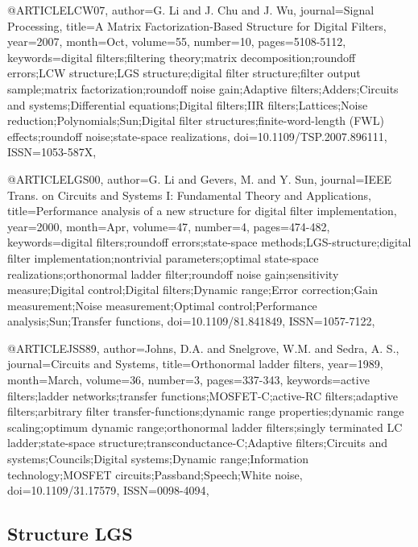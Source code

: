  

@ARTICLE{LCW07, 
author={G. Li and J. Chu and J. Wu}, 
journal={Signal Processing}, 
title={A Matrix Factorization-Based Structure for Digital Filters}, 
year={2007}, 
month={Oct}, 
volume={55}, 
number={10}, 
pages={5108-5112}, 
keywords={digital filters;filtering theory;matrix decomposition;roundoff errors;LCW structure;LGS structure;digital filter structure;filter output sample;matrix factorization;roundoff noise gain;Adaptive filters;Adders;Circuits and systems;Differential equations;Digital filters;IIR filters;Lattices;Noise reduction;Polynomials;Sun;Digital filter structures;finite-word-length (FWL) effects;roundoff noise;state-space realizations}, 
doi={10.1109/TSP.2007.896111}, 
ISSN={1053-587X},}

@ARTICLE{LGS00, 
author={G. Li and Gevers, M. and Y. Sun}, 
journal={{IEEE} Trans. on  Circuits and Systems I: Fundamental Theory and Applications}, 
title={Performance analysis of a new structure for digital filter implementation}, 
year={2000}, 
month={Apr}, 
volume={47}, 
number={4}, 
pages={474-482}, 
keywords={digital filters;roundoff errors;state-space methods;LGS-structure;digital filter implementation;nontrivial parameters;optimal state-space realizations;orthonormal ladder filter;roundoff noise gain;sensitivity measure;Digital control;Digital filters;Dynamic range;Error correction;Gain measurement;Noise measurement;Optimal control;Performance analysis;Sun;Transfer functions}, 
doi={10.1109/81.841849}, 
ISSN={1057-7122},}

@ARTICLE{JSS89, 
author={Johns, D.A. and Snelgrove, W.M. and Sedra, A. S.}, 
journal={Circuits and Systems}, 
title={Orthonormal ladder filters}, 
year={1989}, 
month={March}, 
volume={36}, 
number={3}, 
pages={337-343}, 
keywords={active filters;ladder networks;transfer functions;MOSFET-C;active-RC filters;adaptive filters;arbitrary filter transfer-functions;dynamic range properties;dynamic range scaling;optimum dynamic range;orthonormal ladder filters;singly terminated LC ladder;state-space structure;transconductance-C;Adaptive filters;Circuits and systems;Councils;Digital systems;Dynamic range;Information technology;MOSFET circuits;Passband;Speech;White noise}, 
doi={10.1109/31.17579}, 
ISSN={0098-4094},}



\subsection{Structure LGS}


